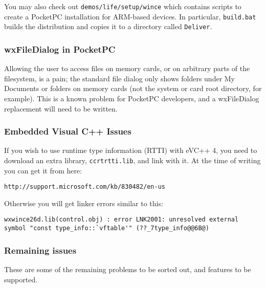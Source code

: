 You may also check out {\tt demos/life/setup/wince} which contains
scripts to create a PocketPC installation for ARM-based
devices. In particular, {\tt build.bat} builds the distribution and
copies it to a directory called {\tt Deliver}.

\subsubsection{wxFileDialog in PocketPC}

Allowing the user to access files on memory cards, or on arbitrary
parts of the filesystem, is a pain; the standard file dialog only
shows folders under My Documents or folders on memory cards
(not the system or card root directory, for example). This is
a known problem for PocketPC developers, and a wxFileDialog
replacement will need to be written.

\subsubsection{Embedded Visual C++ Issues}


If you wish to use runtime type information (RTTI) with eVC++ 4, you need to download
an extra library, {\tt ccrtrtti.lib}, and link with it. At the time of
writing you can get it from here:

\begin{verbatim}
http://support.microsoft.com/kb/830482/en-us
\end{verbatim}

Otherwise you will get linker errors similar to this:

\begin{verbatim}
wxwince26d.lib(control.obj) : error LNK2001: unresolved external symbol "const type_info::`vftable'" (??_7type_info@@6B@)
\end{verbatim}

\subsubsection{Remaining issues}

These are some of the remaining problems to be sorted out, and features
to be supported.

